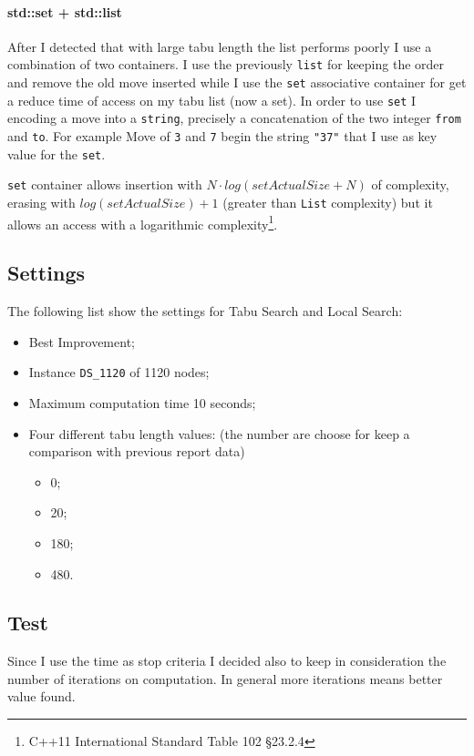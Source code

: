 		\paragraph{std::set + std::list} After I detected that with large tabu length the list performs poorly I use a combination of two containers. I use the previously \verb|list| for keeping the order and remove the old move inserted while I use the \verb|set| associative container for get a reduce time of access on my tabu list (now a set). In order to use \verb|set| I encoding a move into a \verb|string|, precisely a concatenation of the two integer \verb|from| and \verb|to|. For example Move of \verb|3| and \verb|7| begin the string \verb|"37"| that I use as key value for the \verb|set|.
		
		\verb|set| container allows insertion  with $N \cdot log (setActualSize + N)$ of complexity, erasing with $log(setActualSize) +  1$ (greater than \verb|List| complexity) but it allows an access with a logarithmic complexity\footnote{C++11 International Standard Table 102 §23.2.4}. 

\subsection{Settings}
\label{subsec:settings}
The following list show the settings for Tabu Search and Local Search:
\begin{itemize}
	\item Best Improvement;
	\item Instance \verb|DS_1120| of 1120 nodes;
	\item Maximum computation time 10 seconds;
	\item Four different tabu length values: (the number are choose for keep a comparison with previous report data)
	\begin{itemize}
		\item 0;
		\item 20;
		\item 180;
		\item 480.
	\end{itemize}
\end{itemize}

\subsection{Test}
	Since I use the time as stop criteria I decided also to keep in consideration the number of iterations on computation. In general more iterations means better value found.
	

